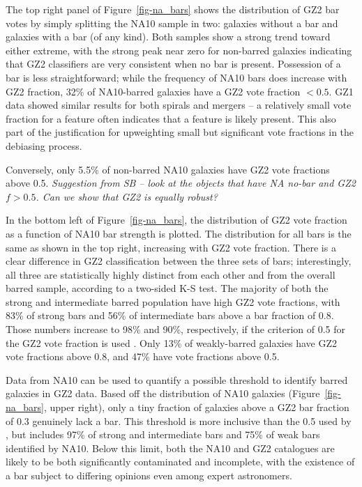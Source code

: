 \documentclass[useAMS,usenatbib]{mn2e}
\begin{document}
The top right panel of Figure~\ref{fig-na_bars} shows the distribution of GZ2 bar votes by simply splitting the NA10 sample in two: galaxies without a bar and galaxies with a bar (of any kind). Both samples show a strong trend toward either extreme, with the strong peak near zero for non-barred galaxies indicating that GZ2 classifiers are very consistent when no bar is present. Possession of a bar is less straightforward; while the frequency of NA10 bars does increase with GZ2 fraction, 32\% of NA10-barred galaxies have a GZ2 vote fraction $<0.5$. GZ1 data showed similar results for both spirals \citep{bam09} and mergers \citep{dar10a} -- a relatively small vote fraction for a feature often indicates that a feature is likely present. This also part of the justification for upweighting small but significant vote fractions in the debiasing process.  

Conversely, only 5.5\% of non-barred NA10 galaxies have GZ2 vote fractions above 0.5. {\em Suggestion from SB -- look at the objects that have NA no-bar and GZ2 $f > 0.5$. Can we show that GZ2 is equally robust?}

In the bottom left of Figure~\ref{fig-na_bars}, the distribution of GZ2 vote fraction as a function of NA10 bar strength is plotted. The distribution for all bars is the same as shown in the top right, increasing with GZ2 vote fraction. There is a clear difference in GZ2 classification between the three sets of bars; interestingly, all three are statistically highly distinct from each other and from the overall barred sample, according to a two-sided K-S test. The majority of both the strong and intermediate barred population have high GZ2 vote fractions, with 83\% of strong bars and 56\% of intermediate bars above a bar fraction of 0.8. Those numbers increase to 98\% and 90\%, respectively, if the criterion of 0.5 for the GZ2 vote fraction is used \citep{mas11c}. Only 13\% of weakly-barred galaxies have GZ2 vote fractions above 0.8, and 47\% have vote fractions above 0.5. 

Data from NA10 can be used to quantify a possible threshold to identify barred galaxies in GZ2 data. Based off the distribution of NA10 galaxies (Figure~\ref{fig-na_bars}, upper right), only a tiny fraction of galaxies above a GZ2 bar fraction of 0.3 genuinely lack a bar. This threshold is more inclusive than the 0.5 used by \citet{mas11c}, but includes 97\% of strong and intermediate bars and 75\% of weak bars identified by NA10. Below this limit, both the NA10 and GZ2 catalogues are likely to be both significantly contaminated and incomplete, with the existence of a bar subject to differing opinions even among expert astronomers. 
\end{document}
